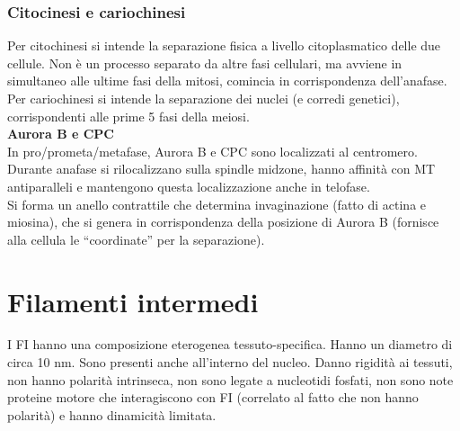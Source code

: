         \subsubsection{Citocinesi e cariochinesi}
            Per citochinesi si intende la separazione fisica a livello citoplasmatico delle due cellule. Non è un processo separato da altre fasi cellulari, ma avviene in simultaneo alle ultime fasi della mitosi, comincia in corrispondenza dell’anafase.\\
            Per cariochinesi si intende la separazione dei nuclei (e corredi genetici), corrispondenti alle prime 5 fasi della meiosi.\\
            
            \textbf{Aurora B e CPC}\\
            In pro/prometa/metafase, Aurora B e CPC sono localizzati al centromero.\\
            Durante anafase si rilocalizzano sulla spindle midzone, hanno affinità con MT antiparalleli e mantengono questa localizzazione anche in telofase.\\
            Si forma un anello contrattile che determina invaginazione (fatto di actina e miosina), che si genera in corrispondenza della posizione di Aurora B (fornisce alla cellula le “coordinate” per la separazione).
            
\section{Filamenti intermedi}
    I FI hanno una composizione eterogenea tessuto-specifica. Hanno un diametro di circa 10 nm.
    Sono presenti anche all'interno del nucleo. Danno rigidità ai tessuti, non hanno polarità intrinseca, non sono legate a nucleotidi fosfati, non sono note proteine motore che interagiscono con FI (correlato al fatto che non hanno polarità) e hanno dinamicità limitata.
    
